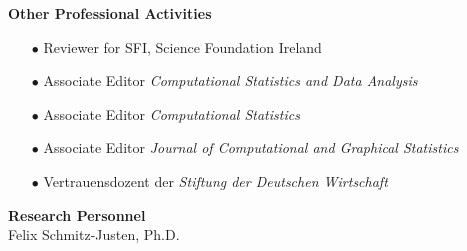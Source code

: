 \vspace{0.6cm}
\textbf{Other Professional Activities}\\[-0.25cm]
\begin{enumerate}
\item[$\bullet$]	Reviewer for SFI, Science Foundation Ireland
\item[$\bullet$]	Associate Editor \textit{Computational Statistics and Data Analysis}
\item[$\bullet$]	Associate Editor \textit{Computational Statistics}
\item[$\bullet$]	Associate Editor \textit{Journal of Computational and Graphical Statistics}
\item[$\bullet$]	Vertrauensdozent der \textit{Stiftung der Deutschen Wirtschaft}
\end{enumerate}


\vspace{0.6cm}
\textbf{Research Personnel}\\[-0.25cm]

Felix Schmitz-Justen, Ph.D.
